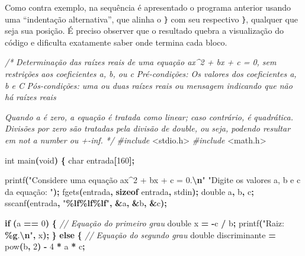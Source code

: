 \documentclass[
  11pt,
  a4paper,
]{scrbook}
\newenvironment{Shaded}{\begin{snugshade}}{\end{snugshade}}
\newcommand{\CommentTok}[1]{\textcolor[rgb]{0.56,0.35,0.01}{\textit{#1}}}
\newcommand{\ControlFlowTok}[1]{\textcolor[rgb]{0.13,0.29,0.53}{\textbf{#1}}}
\newcommand{\DataTypeTok}[1]{\textcolor[rgb]{0.13,0.29,0.53}{#1}}
\newcommand{\DecValTok}[1]{\textcolor[rgb]{0.00,0.00,0.81}{#1}}
\newcommand{\ImportTok}[1]{#1}
\newcommand{\KeywordTok}[1]{\textcolor[rgb]{0.13,0.29,0.53}{\textbf{#1}}}
\newcommand{\NormalTok}[1]{#1}
\newcommand{\OperatorTok}[1]{\textcolor[rgb]{0.81,0.36,0.00}{\textbf{#1}}}
\newcommand{\PreprocessorTok}[1]{\textcolor[rgb]{0.56,0.35,0.01}{\textit{#1}}}
\newcommand{\SpecialCharTok}[1]{\textcolor[rgb]{0.81,0.36,0.00}{\textbf{#1}}}
\newcommand{\StringTok}[1]{\textcolor[rgb]{0.31,0.60,0.02}{#1}}
\begin{document}
Como contra exemplo, na sequência é apresentado o programa anterior
usando uma ``indentação alternativa'', que alinha o \texttt{\}} com seu
respectivo \texttt{\}}, qualquer que seja sua posição. É preciso
observer que o resultado quebra a visualização do código e dificulta
exatamente saber onde termina cada bloco.

\begin{Shaded}
\begin{Highlighting}[]
\CommentTok{/*}
\CommentTok{Determinação das raízes reais de uma equação ax\^{}2 + bx + c = 0, sem restrições}
\CommentTok{    aos coeficientes a, b, ou c}
\CommentTok{Pré{-}condições: Os valores dos coeficientes a, b e C}
\CommentTok{Pós{-}condições: uma ou duas raízes reais ou mensagem indicando que não há}
\CommentTok{    raízes reais}

\CommentTok{Quando a é zero, a equação é tratada como linear; caso contrário, é}
\CommentTok{quadrática. Divisões por zero são tratadas pela divisão de double, ou}
\CommentTok{seja, podendo resultar em \textquotesingle{}not a number\textquotesingle{} ou +{-}inf.}
\CommentTok{*/}
\PreprocessorTok{\#include }\ImportTok{\textless{}stdio.h\textgreater{}}
\PreprocessorTok{\#include }\ImportTok{\textless{}math.h\textgreater{}}

\DataTypeTok{int}\NormalTok{ main}\OperatorTok{(}\DataTypeTok{void}\OperatorTok{)} \OperatorTok{\{}
    \DataTypeTok{char}\NormalTok{ entrada}\OperatorTok{[}\DecValTok{160}\OperatorTok{];}

\NormalTok{    printf}\OperatorTok{(}\StringTok{"Considere uma equação ax\^{}2 + bx + c = 0.}\SpecialCharTok{\textbackslash{}n}\StringTok{"}
           \StringTok{"Digite os valores a, b e c da equação: "}\OperatorTok{);}
\NormalTok{    fgets}\OperatorTok{(}\NormalTok{entrada}\OperatorTok{,} \KeywordTok{sizeof}\NormalTok{ entrada}\OperatorTok{,}\NormalTok{ stdin}\OperatorTok{);}
    \DataTypeTok{double}\NormalTok{ a}\OperatorTok{,}\NormalTok{ b}\OperatorTok{,}\NormalTok{ c}\OperatorTok{;}
\NormalTok{    sscanf}\OperatorTok{(}\NormalTok{entrada}\OperatorTok{,} \StringTok{"}\SpecialCharTok{\%lf\%lf\%lf}\StringTok{"}\OperatorTok{,} \OperatorTok{\&}\NormalTok{a}\OperatorTok{,} \OperatorTok{\&}\NormalTok{b}\OperatorTok{,} \OperatorTok{\&}\NormalTok{c}\OperatorTok{);}

    \ControlFlowTok{if} \OperatorTok{(}\NormalTok{a }\OperatorTok{==} \DecValTok{0}\OperatorTok{)} \OperatorTok{\{}
        \CommentTok{// Equação do primeiro grau}
        \DataTypeTok{double}\NormalTok{ x }\OperatorTok{=} \OperatorTok{{-}}\NormalTok{c }\OperatorTok{/}\NormalTok{ b}\OperatorTok{;}  
\NormalTok{        printf}\OperatorTok{(}\StringTok{"Raiz: }\SpecialCharTok{\%g}\StringTok{.}\SpecialCharTok{\textbackslash{}n}\StringTok{"}\OperatorTok{,}\NormalTok{ x}\OperatorTok{);}
                \OperatorTok{\}}
    \ControlFlowTok{else} \OperatorTok{\{}
        \CommentTok{// Equação do segundo grau}
        \DataTypeTok{double}\NormalTok{ discriminante }\OperatorTok{=}\NormalTok{ pow}\OperatorTok{(}\NormalTok{b}\OperatorTok{,} \DecValTok{2}\OperatorTok{)} \OperatorTok{{-}} \DecValTok{4} \OperatorTok{*}\NormalTok{ a }\OperatorTok{*}\NormalTok{ c}\OperatorTok{;}


\end{Highlighting}
\end{Shaded}
\end{document}
